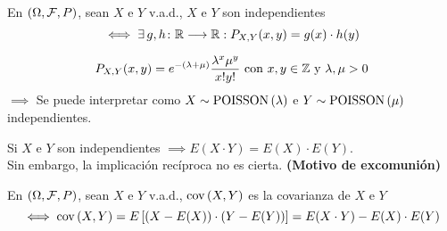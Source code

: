 \begin{teo}
	En $(\Omega, \mathcal{F}, P)$, sean $X$ e $Y$ v.a.d., $X$ e $Y$ son independientes
	\[\iff \exists \, g, h \colon \mathbb{R} \longrightarrow \mathbb{R} : P_{X,Y}(x,y)=g(x)\cdot h(y)\]
\end{teo}

\begin{ejem}
	\[P_{X, Y}(x,y) = e^{-(\lambda+\mu)}\frac{\lambda^x\mu^y}{x! y!} \text{ con } x,y \in \mathbb{Z} \text{ y } \lambda, \mu >0\]
	$\implies$ Se puede interpretar como $X\sim\operatorname{POISSON}\left(\lambda\right)$ e $Y\sim\operatorname{POISSON}\left(\mu\right)$ independientes.
\end{ejem}

\begin{obs}
	Si $X$ e $Y$ son independientes $\implies E(X\cdot Y)=E(X)\cdot E(Y)$. \\
	Sin embargo, la implicación recíproca no es cierta. \hfill \textbf{(Motivo de excomunión)}
\end{obs}

\begin{defn}[Covarianza]
	En $(\Omega, \mathcal{F}, P)$, sean $X$ e $Y$ v.a.d., $\operatorname{cov}\left(X, Y\right)$ es la covarianza de $X$ e $Y$
	\[\iff \operatorname{cov}\left(X, Y\right) = E\left[(X-E(X))\cdot (Y-E(Y))\right] = E(X\cdot Y)-E(X)\cdot E(Y)\]
\end{defn}



